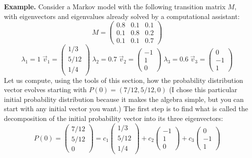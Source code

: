 \documentclass[
]{book}
\theoremstyle{definition}
\theoremstyle{definition}
\theoremstyle{definition}
\theoremstyle{remark}
\begin{document}
\textbf{Example.} Consider a Markov model with the following transition matrix \(M\), with eigenvectors and eigenvalues already solved by a computational assistant:
\[ M = \left(\begin{array}{ccc} 0.8 & 0.1  & 0.1  \\ 0.1 & 0.8 & 0.2 \\ 0.1 & 0.1 & 0.7 \end{array}\right)\]
\[ \lambda_1 = 1 \; \vec v_1= \left(\begin{array}{c} 1/3     \\  5/12  \\ 1/4 \end{array}\right) \; \lambda_2 = 0.7  \;  \vec v_2= \left(\begin{array}{c} -1   \\ 1  \\ 0 \end{array}\right) \; \lambda_3 = 0.6  \;  \vec v_3= \left(\begin{array}{c} 0  \\ -1  \\ 1 \end{array}\right)\]
Let us compute, using the tools of this section, how the probability distribution vector evolves starting with \(P(0) = (7/12,5/12,0)\) (I chose this particular initial probability distribution because it makes the algebra simple, but you can start with any initial vector you want.) The first step is to find what is called the decomposition of the initial probability vector into its three eigenvectors:
\[P(0)= \left(\begin{array}{c} 7/12 \\ 5/12  \\ 0 \end{array}\right) =  c_1\left(\begin{array}{c} 1/3     \\  5/12  \\ 1/4 \end{array}\right) + c_2 \left(\begin{array}{c} -1   \\ 1  \\ 0 \end{array}\right) + c_3\left(\begin{array}{c} 0  \\ -1  \\ 1 \end{array}\right)\]
\end{document}
